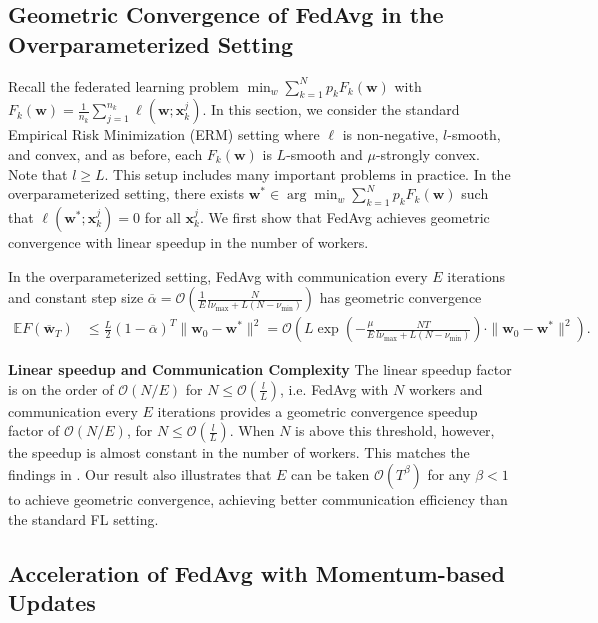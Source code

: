 \subsection{Geometric Convergence of FedAvg in the Overparameterized Setting}
Recall the federated learning problem $\min_{w}\sum_{k=1}^{N}p_{k}F_{k}(\mathbf{w})$
with $F_{k}(\mathbf{w})=\frac{1}{n_{k}}\sum_{j=1}^{n_{k}}\ell(\mathbf{w};\mathbf{x}_{k}^{j})$.
In this section, we consider the standard Empirical Risk Minimization (ERM) setting where $\ell$
is non-negative, $l$-smooth, and convex, and as before, each $F_{k}(\mathbf{w})$ is $L$-smooth and $\mu$-strongly convex. Note that $l\geq L$. This
setup includes many important problems in practice. In the overparameterized
setting, there exists $\mathbf{w}^{\ast}\in\arg\min_{w}\sum_{k=1}^{N}p_{k}F_{k}(\mathbf{w})$
such that $\ell(\mathbf{w}^{\ast};\mathbf{x}_{k}^{j})=0$ for all
$\mathbf{x}_{k}^{j}$. We first show that FedAvg achieves geometric convergence
with linear speedup in the number of workers. 
\begin{theorem}
	\label{thm:overparameterized_general}In the overparameterized setting,
	FedAvg with communication every $E$ iterations
	and constant step size $\overline{\alpha}=\mathcal{O}(\frac{1}{E}\frac{N}{l\nu_{\max}+L(N-\nu_{\min})})$
	has geometric convergence
	\begin{align*}
	\mathbb{E}F(\overline{\mathbf{w}}_{T}) & \leq\frac{L}{2}(1-\overline{\alpha})^{T}\|\mathbf{w}_{0}-\mathbf{w}^{\ast}\|^{2}=\mathcal{O}\left(L\exp\left(-\frac{\mu}{E}\frac{NT}{l\nu_{\max}+L(N-\nu_{\min})}\right)\cdot\|\mathbf{w}_{0}-\mathbf{w}^{\ast}\|^{2}\right).
	\end{align*}
\end{theorem}
%
\textbf{Linear speedup and Communication Complexity} The linear speedup factor is on the order of $\mathcal{O}(N/E)$ %
for $N\leq\mathcal{O}(\frac{l}{L})$, i.e. FedAvg with $N$ workers and communication
every $E$ iterations provides a geometric convergence speedup factor
of $\mathcal{O}(N/E)$, for $N\leq\mathcal{O}(\frac{l}{L})$. When $N$ is above
this threshold, however, the speedup is almost constant in the number
of workers. This matches the findings in \cite{ma2017power}. Our
result also illustrates that $E$ can be taken $\mathcal{O}(T^{\beta})$
for any $\beta<1$ to achieve geometric convergence, achieving better communication efficiency than
the standard FL setting. 

\subsection{Acceleration of FedAvg with Momentum-based Updates}

